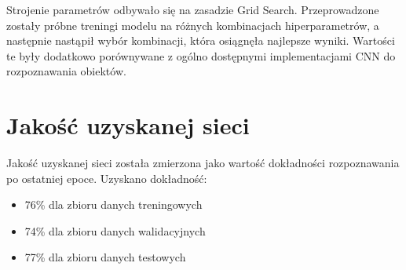\documentclass[11pt]{article}
\begin{document}
	Strojenie parametrów odbywało się na zasadzie Grid Search. Przeprowadzone zostały próbne treningi modelu na różnych kombinacjach hiperparametrów, a następnie nastąpił wybór kombinacji,
	która osiągnęła najlepsze wyniki. Wartości te były dodatkowo porównywane z ogólno dostępnymi implementacjami CNN do rozpoznawania obiektów.

	\section {Jakość uzyskanej sieci}
	Jakość uzyskanej sieci została zmierzona jako wartość dokładności rozpoznawania po ostatniej epoce. Uzyskano dokładność:
	\begin{itemize}
		\item 76\% dla zbioru danych treningowych
		\item 74\% dla zbioru danych walidacyjnych
		\item 77\% dla zbioru danych testowych
	\end{itemize}
\end{document}

